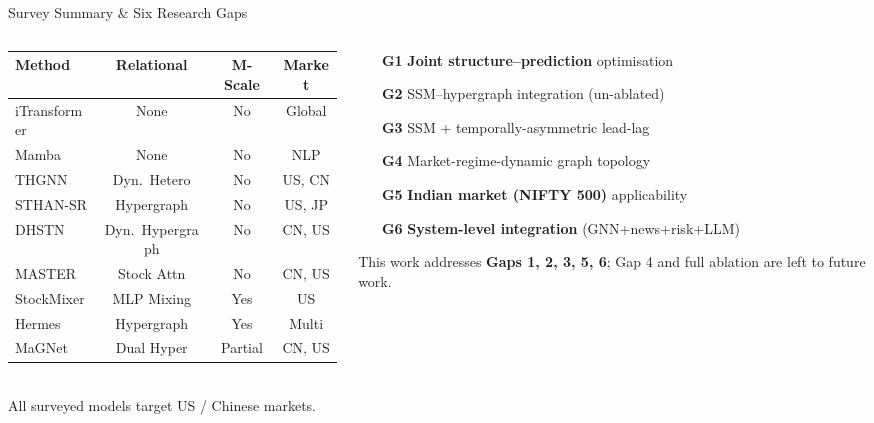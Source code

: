 \documentclass[aspectratio=169, 10pt]{beamer}
\newcommand{\best}[1]{\textcolor{primary}{\textbf{#1}}}
\begin{document}
\begin{frame}{Survey Summary \& Six Research Gaps}
  \begin{columns}[T]
    \begin{column}{0.50\textwidth}
      \centering
      \renewcommand{\arraystretch}{1.12}
      \scriptsize
      \begin{tabular}{lccc}
        \toprule
        \textbf{Method} & \textbf{Relational} & \textbf{M-Scale} & \textbf{Market} \\
        \midrule
        iTransformer & None    & No  & Global \\
        Mamba        & None    & No  & NLP \\
        THGNN        & Dyn.\ Hetero & No  & US, CN \\
        STHAN-SR     & Hypergraph   & No  & US, JP \\
        DHSTN        & Dyn.\ Hypergraph & No & CN, US \\
        MASTER       & Stock Attn   & No  & CN, US \\
        StockMixer   & MLP Mixing   & Yes & US \\
        Hermes       & Hypergraph   & Yes & Multi \\
        \alert{MaGNet} & \alert{Dual Hyper} & Partial & CN, US \\
        \bottomrule
      \end{tabular}\\[3pt]
      \scriptsize All surveyed models target \alert{US / Chinese} markets.
    \end{column}
    \begin{column}{0.49\textwidth}
      \footnotesize
      \begin{enumerate}\setlength{\itemsep}{2pt}
        \item[\textbf{G1}] \best{Joint structure–prediction} optimisation
        \item[\textbf{G2}] SSM–hypergraph integration (un-ablated)
        \item[\textbf{G3}] SSM + temporally-asymmetric lead-lag
        \item[\textbf{G4}] Market-regime-dynamic graph topology
        \item[\textbf{G5}] \best{Indian market (NIFTY 500)} applicability
        \item[\textbf{G6}] \best{System-level integration} (GNN+news+risk+LLM)
      \end{enumerate}
      \smallskip
      \begin{block}{}
        \footnotesize This work addresses \best{Gaps 1, 2, 3, 5, 6};
        Gap 4 and full ablation are left to future work.
      \end{block}
    \end{column}
  \end{columns}
\end{frame}
\end{document}
